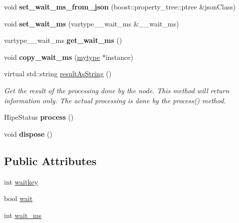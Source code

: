 \begin{DoxyCompactItemize}
\item 
\mbox{\label{classfilter_1_1algos_1_1_show_image_a28deccfdd251dc33b73626ee83220d83}} 
void {\bfseries set\+\_\+wait\+\_\+ms\+\_\+from\+\_\+json} (boost\+::property\+\_\+tree\+::ptree \&json\+Class)
\item 
\mbox{\label{classfilter_1_1algos_1_1_show_image_a6b3a8cc1d8a500a3721d30d68c391c4a}} 
void {\bfseries set\+\_\+wait\+\_\+ms} (vartype\+\_\+\+\_\+wait\+\_\+ms \&\+\_\+\+\_\+wait\+\_\+ms)
\item 
\mbox{\label{classfilter_1_1algos_1_1_show_image_a4b75203663d16b82772d723e481277b4}} 
vartype\+\_\+\+\_\+wait\+\_\+ms {\bfseries get\+\_\+wait\+\_\+ms} ()
\item 
\mbox{\label{classfilter_1_1algos_1_1_show_image_a99dd70baf13335f9118df81a9b6105e4}} 
void {\bfseries copy\+\_\+wait\+\_\+ms} (\hyperlink{classfilter_1_1algos_1_1_show_image}{mytype} $\ast$instance)
\item 
virtual std\+::string \hyperlink{classfilter_1_1algos_1_1_show_image_a752acc552a91b93b42acf0a1269b5e73}{result\+As\+String} ()
\begin{DoxyCompactList}\small\item\em Get the result of the processing done by the node. This method will return information only. The actual processing is done by the process() method. \end{DoxyCompactList}\item 
\mbox{\label{classfilter_1_1algos_1_1_show_image_a8209eb9b5ec5031c6afe179183fd64da}} 
Hipe\+Status {\bfseries process} ()
\item 
\mbox{\label{classfilter_1_1algos_1_1_show_image_a292a997b25d85e97f92f193b0db58091}} 
void {\bfseries dispose} ()
\end{DoxyCompactItemize}
\subsection*{Public Attributes}
\begin{DoxyCompactItemize}
\item 
int \hyperlink{classfilter_1_1algos_1_1_show_image_a111835d4501c5b624454a8e7525efeec}{waitkey}
\item 
bool \hyperlink{classfilter_1_1algos_1_1_show_image_a5c05f36480a4e9d042d8277255818961}{wait}
\item 
int \hyperlink{classfilter_1_1algos_1_1_show_image_a2d6440527607e2b53027b1a74140a38c}{wait\+\_\+ms}
\end{DoxyCompactItemize}
